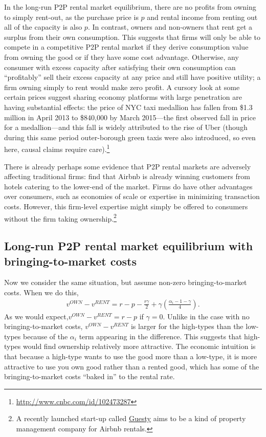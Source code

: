 \documentclass[11pt]{article}
\begin{document}
In the long-run P2P rental market equilibrium, there are no profits from owning to simply rent-out, as the purchase price is $p$ and rental income from renting out all of the capacity is also $p$.  
In contrast, owners and non-owners that rent get a surplus from their own consumption. 
This suggests that firms will only be able to compete in a competitive P2P rental market if they derive consumption value from owning the good or if they have some cost advantage.
Otherwise, any consumer with excess capacity after satisfying their own consumption can ``profitably'' sell their excess capacity at any price and still have positive utility; a firm owning simply to rent would make zero profit.
A cursory look at some certain prices suggest sharing economy platforms with large penetration are having substantial effects:  
the price of NYC taxi medallion has fallen from \$1.3 million in April 2013 to \$840,000 by March 2015---the first observed fall in price for a medallion---and this fall is widely attributed to the rise of Uber (though during this same period outer-borough green taxis were also introduced, so even here, causal claims require care).\footnote{
  \url{http://www.cnbc.com/id/102473287}
}

There is already perhaps some evidence that P2P rental markets are adversely affecting traditional firms: 
\cite{byers2013rise} find that Airbnb is already winning customers from hotels catering to the lower-end of the market. 
Firms do have other advantages over consumers, such as economies of scale or expertise in minimizing transaction costs. 
However, this firm-level expertise might simply be offered to consumers without the firm taking ownership.\footnote{
  A recently launched start-up called \href{https://www.guesty.com/}{Guesty} aims to be a kind of property management company for Airbnb rentals.
} 

\subsection{Long-run P2P rental market equilibrium with bringing-to-market costs}
Now we consider the same situation, but assume non-zero bringing-to-market costs.
When we do this,
\begin{align}
  v^{OWN} - v^{RENT} = r - p - \frac{r\gamma}{2} + \gamma \left( \frac{\alpha_i - 1 - \gamma}{4} \right). 
\end{align}
As we would expect,$v^{OWN} - v^{RENT} = r - p$ if $\gamma = 0$. 
Unlike in the case with no bringing-to-market costs, $v^{OWN} - v^{RENT}$ is larger for the high-types than the low-types because of the $\alpha_i$ term appearing in the difference.
This suggests that high-types would find ownership relatively more attractive.
The economic intuition is that because a high-type wants to use the good more than a low-type, it is more attractive to use you own good rather than a rented good, which has some of the bringing-to-market costs ``baked in'' to the rental rate. 
\end{document}
